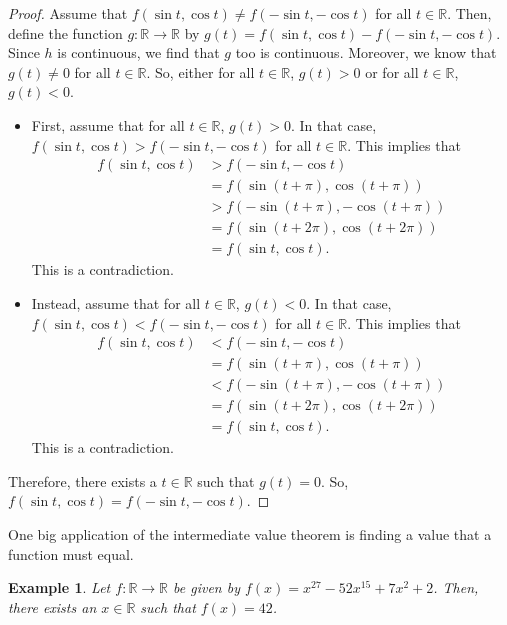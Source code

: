 \documentclass[a4paper, openany]{memoir}
\theoremstyle{definition}
\theoremstyle{plain}
\newtheorem{example}[definition]{Example}
\begin{document}
\begin{proof}
Assume that $f(\sin t, \cos t) \neq f(-\sin t, -\cos t)$ for all $t \in \mathbb{R}$. Then, define the function $g: \mathbb{R} \to \mathbb{R}$ by $g(t) = f(\sin t, \cos t) - f(-\sin t, -\cos t)$. Since $h$ is continuous, we find that $g$ too is continuous. Moreover, we know that $g(t) \neq 0$ for all $t \in \mathbb{R}$. So, either for all $t \in \mathbb{R}$, $g(t) > 0$ or for all $t \in \mathbb{R}$, $g(t) < 0$.
\begin{itemize}
    \item First, assume that for all $t \in \mathbb{R}$, $g(t) > 0$. In that case, $f(\sin t, \cos t) > f(-\sin t, -\cos t)$ for all $t \in \mathbb{R}$. This implies that
    \begin{align*}
        f(\sin t, \cos t) &> f(-\sin t, -\cos t) \\
        &= f(\sin (t + \pi), \cos (t + \pi)) \\
        &> f(-\sin (t + \pi), -\cos (t + \pi)) \\
        &= f(\sin (t + 2\pi), \cos (t + 2\pi)) \\
        &= f(\sin t, \cos t).
    \end{align*}
    This is a contradiction.
    
    \item Instead, assume that for all $t \in \mathbb{R}$, $g(t) < 0$. In that case, $f(\sin t, \cos t) < f(-\sin t, -\cos t)$ for all $t \in \mathbb{R}$. This implies that
    \begin{align*}
        f(\sin t, \cos t) &< f(-\sin t, -\cos t) \\
        &= f(\sin (t + \pi), \cos (t + \pi)) \\
        &< f(-\sin (t + \pi), -\cos (t + \pi)) \\
        &= f(\sin (t + 2\pi), \cos (t + 2\pi)) \\
        &= f(\sin t, \cos t).
    \end{align*}
    This is a contradiction.
\end{itemize}
Therefore, there exists a $t \in \mathbb{R}$ such that $g(t) = 0$. So, $f(\sin t, \cos t) = f(-\sin t, -\cos t)$.
\end{proof}
\noindent One big application of the intermediate value theorem is finding a value that a function must equal.
\begin{example}
Let $f: \mathbb{R} \to \mathbb{R}$ be given by $f(x) = x^{27} - 52x^{15} + 7x^2 + 2$. Then, there exists an $x \in \mathbb{R}$ such that $f(x) = 42$.
\end{example}
\end{document}
